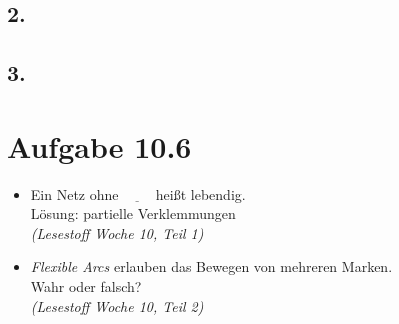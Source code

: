 \documentclass[12pt, paper=a4]{article}
\begin{document}
\subsection*{2.}
\subsection*{3.}

\section*{Aufgabe 10.6}
\begin{itemize}
	\item Ein Netz ohne \(\underline{\qquad}\) hei{\ss}t lebendig.\\
		L\"osung: partielle Verklemmungen\\
		\textit{(Lesestoff Woche 10, Teil 1)}
	\item \textit{Flexible Arcs} erlauben das Bewegen von mehreren Marken.\\
		Wahr oder falsch?\\
		\textit{(Lesestoff Woche 10, Teil 2)}
\end{itemize}
\end{document}
